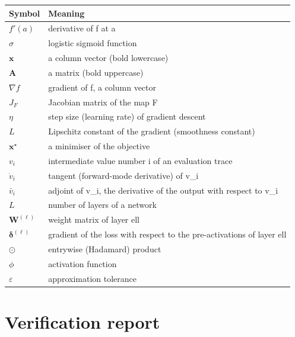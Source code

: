 \documentclass[
  english,
  11pt,
  a4paper,
  twoside,
  open=any,
  numbers=noenddot]{scrbook}
\newcounter{none} %
\theoremstyle{plain}
\theoremstyle{plain}
\theoremstyle{plain}
\theoremstyle{definition}
\theoremstyle{definition}
\theoremstyle{definition}
\theoremstyle{remark}
\begin{document}
{\def\LTcaptype{none} %
\begin{longtable}[]{@{}
  >{\raggedright\arraybackslash}p{}
  >{\raggedright\arraybackslash}p{}@{}}
\toprule\noalign{}
\begin{minipage}[b]{\linewidth}\raggedright
Symbol
\end{minipage} & \begin{minipage}[b]{\linewidth}\raggedright
Meaning
\end{minipage} \\
\midrule\noalign{}
\endhead
\bottomrule\noalign{}
\endlastfoot
\(f'(a)\) & derivative of f at a \\
\(\sigma\) & logistic sigmoid function \\
\(\mathbf{x}\) & a column vector (bold lowercase) \\
\(\mathbf{A}\) & a matrix (bold uppercase) \\
\(\nabla f\) & gradient of f, a column vector \\
\(J_F\) & Jacobian matrix of the map F \\
\(\eta\) & step size (learning rate) of gradient descent \\
\(L\) & Lipschitz constant of the gradient (smoothness constant) \\
\(\mathbf{x}^\star\) & a minimiser of the objective \\
\(v_i\) & intermediate value number i of an evaluation trace \\
\(\dot v_i\) & tangent (forward-mode derivative) of v\_i \\
\(\bar v_i\) & adjoint of v\_i, the derivative of the output with
respect to v\_i \\
\(L\) & number of layers of a network \\
\(\mathbf{W}^{(\ell)}\) & weight matrix of layer ell \\
\(\boldsymbol{\delta}^{(\ell)}\) & gradient of the loss with respect to
the pre-activations of layer ell \\
\(\odot\) & entrywise (Hadamard) product \\
\(\phi\) & activation function \\
\(\varepsilon\) & approximation tolerance \\
\end{longtable}
}

\chapter{Verification report}\label{sec-verification-report}
\end{document}
